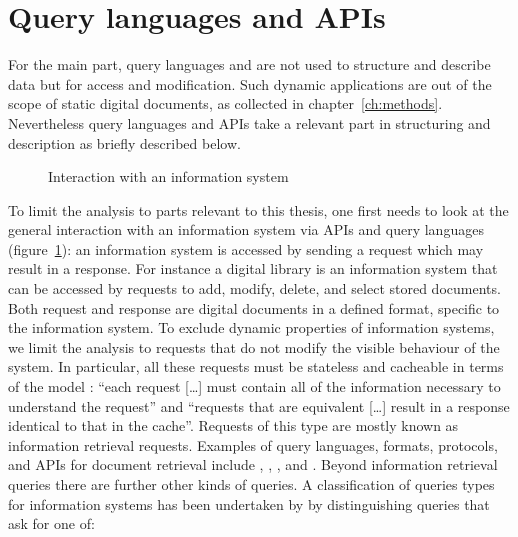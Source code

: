 \section{Query languages and APIs}
\label{sec:queries}
\label{sec:apis}

For the main part, query languages and  are not used to structure and describe data but for access
and modification. Such dynamic applications are out of the scope of static
digital documents, as collected in chapter~\ref{ch:methods}. Nevertheless query
languages and APIs take a relevant part in structuring and description as
briefly described below. 


\begin{figure}[h]
\centering
{}
\caption{Interaction with an information system}
\label{fig:queryis}
\end{figure}

To limit the analysis to parts relevant to this thesis, one first needs to look
at the general interaction with an information system via APIs and query
languages (figure~\ref{fig:queryis}): an information system is accessed by
sending a request which may result in a response. For instance a digital
library is an information system that can be accessed by requests to add,
modify, delete, and select stored documents.  Both request and response are
digital documents in a defined format, specific to the information system.  To
exclude dynamic properties of information systems, we limit the analysis to
requests that do not modify the visible behaviour of the system. In particular,
all these requests must be stateless and cacheable in terms of the
 model \cite{Fielding2000}: ``each
request [\ldots] must contain all of the information necessary to understand
the request'' and ``requests that are equivalent [\ldots] result in a response
identical to that in the cache''. Requests of this type are mostly known as
information retrieval requests. Examples of query languages, formats,
protocols, and APIs for document retrieval include , ,
, and . Beyond information retrieval queries there
are further other kinds of queries.  A classification of queries types
for information systems has been undertaken by \textcite[33]{Reiner1988} by
distinguishing queries that ask for one of:

